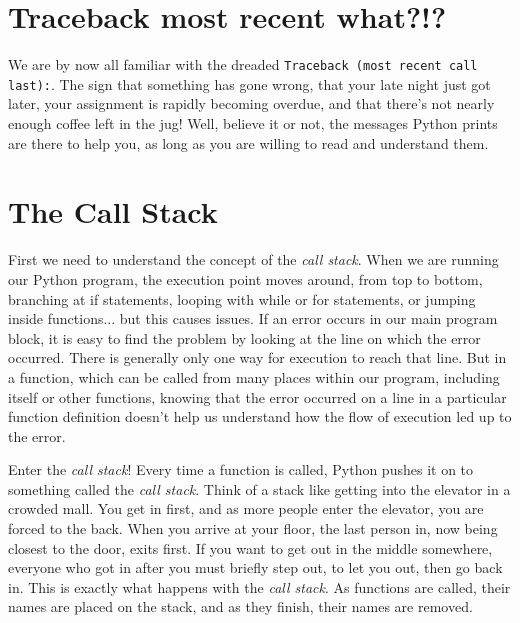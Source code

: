 \section{Traceback most recent what?!?}

We are by now all familiar with the dreaded 
\texttt{Traceback (most   recent call last):}. The sign that something has gone wrong, that   your late night just got later, your assignment is rapidly becoming   overdue, and that there's not nearly enough coffee left in the jug!   Well, believe it or not, the messages Python prints are there to help   you, as long as you are willing to read and understand them.

\section{The Call Stack}

First we need to understand the concept of the \textit{call stack}. When we   are running our Python program, the execution point moves around, from   top to bottom, branching at if statements, looping with while or for   statements, or jumping inside functions...  but this causes issues. If   an error occurs in our main program block, it is easy to find the problem by                  looking at the line on which the error occurred. There is generally only one way for   execution to reach that line. But in a function, which can be called   from many places within our program, including itself or other   functions, knowing that the error occurred on a line in a particular   function definition doesn't help us understand how the flow of   execution led up to the error.

Enter the \textit{call stack}! Every time a   function is called, Python pushes it on to something called the \textit{call   stack}. Think of a stack like getting into the elevator in a crowded   mall. You get in first, and as more people enter the elevator, you are   forced to the back. When you arrive at your floor, the last person in,   now being closest to the door, exits first. If you want to get out in   the middle somewhere, everyone who got in after you must briefly step   out, to let you out, then go back in. This is exactly what happens with   the \textit{call stack}. As functions are called, their names are placed on the   stack, and as they finish, their names are removed.

